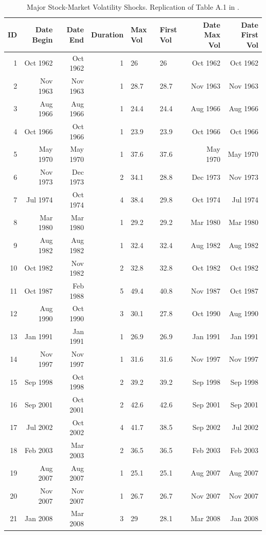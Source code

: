 \documentclass[a4paper,11pt,listof=nochaptergap,oneside,pointednumbers,bibtotoc,bigheadings,liststotoc]{scrbook}
\theoremstyle{mysatz}
\theoremstyle{mydefinition}
\theoremstyle{mybemerkung}
\begin{document}
\begin{spacing}{.9}
\begin{landscape}
\centering
    \begin{longtable}{rrrrllrr}
    \caption[Major Stock-Market Volatility Shocks following \citet{bloom:09}.]{Major Stock-Market Volatility Shocks. Replication of Table A.1 in \citet{bloom:09}.} \\
    \toprule
         ID & Date Begin & Date End & Duration & Max Vol & First Vol & Date Max Vol & Date First Vol \\ \midrule
         1 & Oct 1962 & Oct 1962 & 1 & 26 & 26 & Oct 1962 & Oct 1962 \\
         2 & Nov 1963 & Nov 1963 & 1 & 28.7 & 28.7 & Nov 1963 & Nov 1963 \\
         3 & Aug 1966 & Aug 1966 & 1 & 24.4 & 24.4 & Aug 1966 & Aug 1966 \\
         4 & Oct 1966 & Oct 1966 & 1 & 23.9 & 23.9 & Oct 1966 & Oct 1966 \\
         5 & May 1970 & May 1970 & 1 & 37.6 & 37.6 & May 1970 & May 1970 \\
         6 & Nov 1973 & Dec 1973 & 2 & 34.1 & 28.8 & Dec 1973 & Nov 1973 \\
         7 & Jul 1974 & Oct 1974 & 4 & 38.4 & 29.8 & Oct 1974 & Jul 1974 \\
         8 & Mar 1980 & Mar 1980 & 1 & 29.2 & 29.2 & Mar 1980 & Mar 1980 \\
         9 & Aug 1982 & Aug 1982 & 1 & 32.4 & 32.4 & Aug 1982 & Aug 1982 \\
        10 & Oct 1982 & Nov 1982 & 2 & 32.8 & 32.8 & Oct 1982 & Oct 1982 \\
        11 & Oct 1987 & Feb 1988 & 5 & 49.4 & 40.8 & Nov 1987 & Oct 1987 \\
        12 & Aug 1990 & Oct 1990 & 3 & 30.1 & 27.8 & Oct 1990 & Aug 1990 \\
        13 & Jan 1991 & Jan 1991 & 1 & 26.9 & 26.9 & Jan 1991 & Jan 1991 \\
        14 & Nov 1997 & Nov 1997 & 1 & 31.6 & 31.6 & Nov 1997 & Nov 1997 \\
        15 & Sep 1998 & Oct 1998 & 2 & 39.2 & 39.2 & Sep 1998 & Sep 1998 \\
        16 & Sep 2001 & Oct 2001 & 2 & 42.6 & 42.6 & Sep 2001 & Sep 2001 \\
        17 & Jul 2002 & Oct 2002 & 4 & 41.7 & 38.5 & Sep 2002 & Jul 2002 \\
        18 & Feb 2003 & Mar 2003 & 2 & 36.5 & 36.5 & Feb 2003 & Feb 2003 \\
        19 & Aug 2007 & Aug 2007 & 1 & 25.1 & 25.1 & Aug 2007 & Aug 2007 \\
        20 & Nov 2007 & Nov 2007 & 1 & 26.7 & 26.7 & Nov 2007 & Nov 2007 \\
        21 & Jan 2008 & Mar 2008 & 3 & 29 & 28.1 & Mar 2008 & Jan 2008 \\
\bottomrule
        \end{longtable}
\end{landscape}
\label{tab:bloom_shocks}
\end{spacing}
\end{document}
